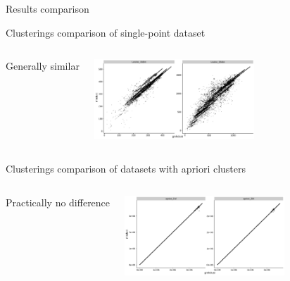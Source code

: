 \documentclass[10pt]{beamer}
\begin{document}
\begin{frame}{Results comparison}
	
	\begin{block}{Clusterings comparison of single-point dataset}
		
		\begin{columns}
			\column{\linewidth-6cm}
			
			Generally similar
			
			\column{6cm}
			\includegraphics[width=6cm]{img/single_result}
			
		\end{columns}
	\end{block}
	
	\begin{block}{Clusterings comparison of datasets with apriori clusters}
		\begin{columns}
			\column{\linewidth-6cm}
			
			
			Practically no difference
			
			\column{6cm}
			\includegraphics[width=6cm]{../img/apriori_result}
			
		\end{columns}
	\end{block}
	
\end{frame}
\end{document}
